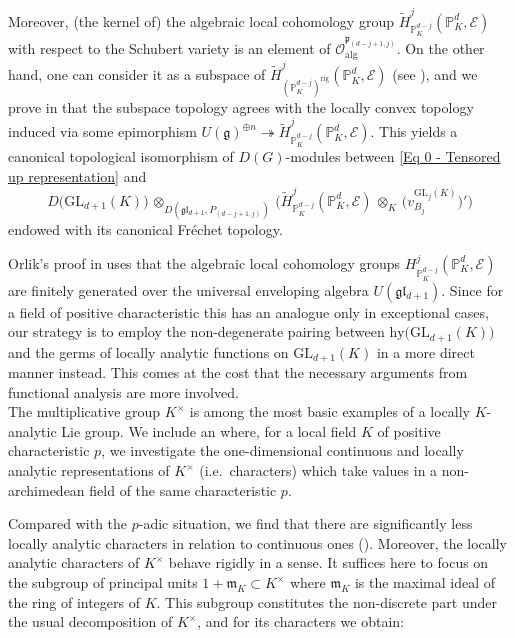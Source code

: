 \documentclass[a4paper, reqno, 10pt]{amsart}
\theoremstyle{definition}
\numberwithin{equation}{section}
\newcommand{\botimes}[1]{{\,\otimes_{#1}\,}}
\newcommand{\GL}{{\mathrm{GL}}}
\newcommand{\hy}{{\mathrm{hy}}}
\newcommand{\rig}{{\mathrm{rig}}}
\newcommand{\unts}{^{\times}}
\newcommand{\BP}{{\mathbb {P}}}
\newcommand{\CE}{{\mathcal {E}}}
\newcommand{\CO}{{\mathcal {O}}}
\newcommand{\Fg}{{\mathfrak {g}}}
\newcommand{\Fl}{{\mathfrak {l}}}
\newcommand{\Fm}{{\mathfrak {m}}}
\newcommand{\Fp}{{\mathfrak {p}}}
\newcommand{\alg}{{\mathrm{alg}}}
\begin{document}
Moreover, (the kernel of) the algebraic local cohomology group $\widetilde{H}^{j}_{\BP_K^{d-j}} (\BP_K^d, \CE)$ with respect to the Schubert variety is an element of $\CO_\alg^{\Fp_{(d-j+1,j)}}$.
On the other hand, one can consider it as a subspace of $\widetilde{H}^{j}_{(\BP_K^{d-j})^\rig} (\BP_K^d, \CE)$ (see ), and we prove in  that the subspace topology agrees with the locally convex topology induced via some epimorphism $U(\Fg)^{\oplus n} \twoheadrightarrow \widetilde{H}^{j}_{\BP_K^{d-j}} (\BP_K^d, \CE)$.
This yields a canonical topological isomorphism of $D(G)$-modules between \eqref{Eq 0 - Tensored up representation} and 
\begin{equation*}
	D\big(\GL_{d+1}(K) \big) \botimes{D(\Fg\Fl_{d+1},P_{(d-j+1,j)})} \Big( \widetilde{H}^{j}_{\BP_K^{d-j}} (\BP_K^d, \CE) \botimes{K} \big( v^{\GL_{j}(K)}_{B_{j}} \big)' \Big)
\end{equation*}
endowed with its canonical Fr\'echet topology.




Orlik's proof in \cite{Orlik08EquivVBDrinfeldUpHalfSp} uses that the algebraic local cohomology groups $H^j_{\BP_K^{d-j}}(\BP_K^d,\CE)$ are finitely generated over the universal enveloping algebra $U(\Fg\Fl_{d+1})$.
Since for a field of positive characteristic this has an analogue only in exceptional cases, our strategy is to employ the non-degenerate pairing between $\hy\big(\GL_{d+1}(K)\big)$ and the germs of locally analytic functions on $\GL_{d+1}(K)$ in a more direct manner instead.
This comes at the cost that the necessary arguments from functional analysis are more involved.
\\


The multiplicative group $K\unts$ is among the most basic examples of a locally $K$-analytic Lie group.
We include an  where, for a local field $K$ of positive characteristic $p$, we investigate the one-dimensional continuous and locally analytic representations of $K\unts$ (i.e.\ characters) which take values in a non-archimedean field of the same characteristic $p$.



Compared with the $p$-adic situation, we find that there are significantly less locally analytic characters in relation to continuous ones ().
Moreover, the locally analytic characters of $K\unts$ behave rigidly in a sense.
It suffices here to focus on the subgroup of principal units $1 +\Fm_K \subset K\unts$ where $\Fm_K$ is the maximal ideal of the ring of integers of $K$.
This subgroup constitutes the non-discrete part under the usual decomposition of $K\unts$, and for its characters we obtain:
\end{document}
